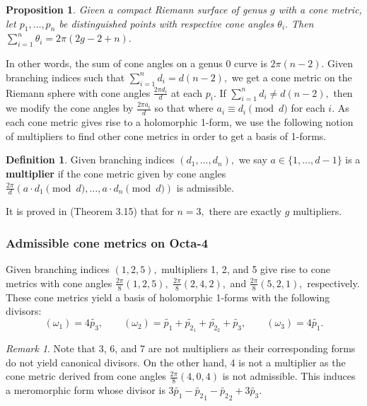 \documentclass[12pt,reqno]{amsart}
\newtheorem*{proposition}{Proposition}
\theoremstyle{definition}
\newtheorem{defn}{Definition}
\theoremstyle{remark}
\newtheorem*{remark}{Remark}
\begin{document}
\begin{proposition} Given a compact Riemann surface of genus $g$ with a cone metric, let $p_1, \ldots, p_n$ be distinguished points with respective cone angles $\theta_i.$ Then $\sum\limits_{i=1}^n \theta_i = 2 \pi (2 g - 2 + n).$
\end{proposition}


In other words, the sum of cone angles on a genus 0 curve is $2 \pi (n - 2).$ Given branching indices such that $\sum\limits_{i=1}^n d_i = d (n - 2),$ we get a cone metric on the Riemann sphere with cone angles $\frac{2 \pi d_i}{d}$ at each $p_i.$ If $\sum\limits_{i=1}^n d_i \neq d (n - 2),$ then we modify the cone angles by $\frac{2 \pi a_i}{d}$ so that where $a_i \equiv d_i \pmod d$ for each $i.$ As each cone metric gives rise to a holomorphic 1-form, we use the following notion of multipliers to find other cone metrics in order to get a basis of 1-forms.

\begin{defn} Given branching indices $(d_1, \ldots , d_n),$ we say $a \in \{1, \ldots, d - 1\}$ is a \textbf{multiplier} if the cone metric given by cone angles $\frac{2 \pi}{d} (a \cdot d_1 \pmod d, \ldots , a \cdot d_n \pmod d)$ is admissible. 
\end{defn}

It is proved in \cite{dthesis} (Theorem 3.15) that for $n = 3,$ there are exactly $g$ multipliers. 

\subsubsection*{Admissible cone metrics on Octa-4} Given branching indices $(1, 2, 5),$ multipliers 1, 2, and 5 give rise to cone metrics with cone angles $\frac{2 \pi}{8}(1, 2, 5),$ $\frac{2 \pi}{8}(2, 4, 2),$ and $\frac{2 \pi}{8}(5, 2, 1),$ respectively. These cone metrics yield a basis of holomorphic 1-forms with the following divisors: $$(\omega_1) = 4 \widetilde{p_3}, \qquad (\omega_2) = \widetilde{p_1} + \widetilde{p_{2_1}} + \widetilde{p_{2_2}} + \widetilde{p_3}, \qquad (\omega_3) = 4 \widetilde{p_1}.$$

\begin{remark} Note that 3, 6, and 7 are not multipliers as their corresponding forms do not yield canonical divisors. On the other hand, 4 is not a multiplier as the cone metric derived from cone angles $\frac{2 \pi}{8} (4, 0, 4)$ is not admissible. This induces a meromorphic form whose divisor is $3 \widetilde{p_1} - \widetilde{p_2}_1 - \widetilde{p_2}_2 + 3 \widetilde{p_3}.$ \end{remark}
\end{document}
